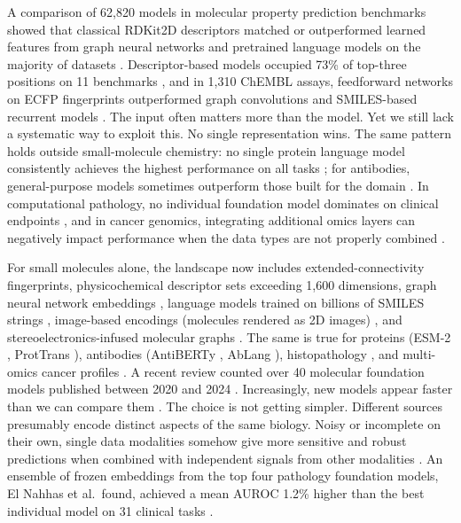 A comparison of 62,820 models in molecular property prediction benchmarks showed that classical RDKit2D descriptors matched or outperformed learned features from graph neural networks and pretrained language models on the majority of datasets \citep{Deng2023}. Descriptor-based models occupied 73\% of top-three positions on 11 benchmarks \citep{Jiang2021}, and in 1,310 ChEMBL assays, feedforward networks on ECFP fingerprints outperformed graph convolutions and SMILES-based recurrent models \citep{Mayr2018}. The input often matters more than the model. Yet we still lack a systematic way to exploit this. No single representation wins. The same pattern holds outside small-molecule chemistry: no single protein language model consistently achieves the highest performance on all tasks \citep{Kenlay2024, Schmirler2024}; for antibodies, general-purpose models sometimes outperform those built for the domain \citep{Kenlay2024}. In computational pathology, no individual foundation model dominates on clinical endpoints \citep{ElNahhas2025}, and in cancer genomics, integrating additional omics layers can negatively impact performance when the data types are not properly combined \citep{Steyaert2023}.

For small molecules alone, the landscape now includes extended-connectivity fingerprints, physicochemical descriptor sets exceeding 1,600 dimensions, graph neural network embeddings \citep{Yang2019, Fang2022}, language models trained on billions of SMILES strings \citep{ross2022}, image-based encodings (molecules rendered as 2D images) \citep{Zeng2022}, and stereoelectronics-infused molecular graphs \citep{Boiko2025}. The same is true for proteins (ESM-2 \citep{Lin2023}, ProtTrans \citep{Elnaggar2022}), antibodies (AntiBERTy \citep{Ruffolo2021}, AbLang \citep{Olsen2022}), histopathology \citep{ElNahhas2025}, and multi-omics cancer profiles \citep{Steyaert2023}. A recent review counted over 40 molecular foundation models published between 2020 and 2024 \citep{Song2026}. Increasingly, new models appear faster than we can compare them \citep{Bommasani2021}. The choice is not getting simpler. Different sources presumably encode distinct aspects of the same biology. Noisy or incomplete on their own, single data modalities somehow give more sensitive and robust predictions when combined with independent signals from other modalities \citep{Steyaert2023}. An ensemble of frozen embeddings from the top four pathology foundation models, El Nahhas et al.\ found, achieved a mean AUROC 1.2\% higher than the best individual model on 31 clinical tasks \citep{ElNahhas2025}.

